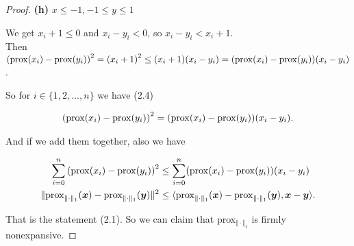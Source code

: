 \documentclass{report}
\begin{document}
\begin{proof}
    {\bf (h)} $x\leq -1,-1\leq y\leq 1$
    \par We get $x_i+1\leq 0$ and $x_i-y_i<0$, so $x_i-y_i<x_i+1$. \\
    Then ${({\rm prox}(x_i)-{\rm prox}(y_i))}^2 = {(x_i+1)}^2 \leq (x_i+1)(x_i-y_i) = ({\rm prox}(x_i)-{\rm prox}(y_i))(x_i-y_i)$. 

    \vspace{3em}

    \par So for $i\in \{1,2,\dots,n\}$ we have (2.4)

    \begin{align*}
        {({\rm prox}(x_i)-{\rm prox}(y_i))}^2=({\rm prox}(x_i)-{\rm prox}(y_i))(x_i-y_i).
    \end{align*}

    And if we add them together, also we have 

    \begin{align*}
        \sum_{i=0}^n{({\rm prox}(x_i)-{\rm prox}(y_i))}^2 &\leq \sum_{i=0}^n({\rm prox}(x_i)-{\rm prox}(y_i))(x_i-y_i) \\
        \Vert {\rm prox}_{\Vert \cdot\Vert_1}(\bm x) - {\rm prox}_{\Vert \cdot\Vert_1}(\bm y)\Vert^2 &\leq \langle {\rm prox}_{\Vert \cdot\Vert_1}(\bm x) - {\rm prox}_{\Vert \cdot\Vert_1}(\bm y),\bm x-\bm y\rangle.
    \end{align*}

    That is the statement (2.1). 
    So we can claim that prox$_{\Vert \cdot\Vert_1}$ is firmly nonexpansive.
\end{proof}
\end{document}
